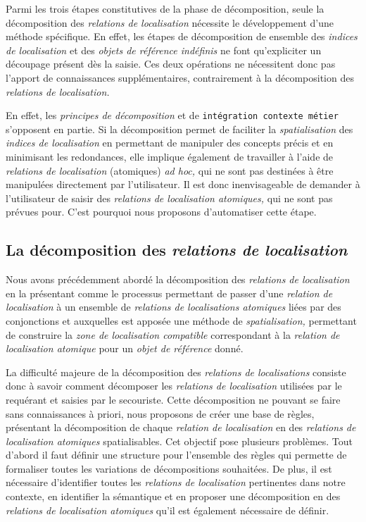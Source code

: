Parmi les trois étapes constitutives de la phase de décomposition,
seule la décomposition des \emph{relations de localisation} nécessite
le développement d'une méthode spécifique. En effet, les étapes de
décomposition de ensemble des \emph{indices de localisation} et des
\emph{objets de référence indéfinis} ne font qu'expliciter un
découpage présent dès la saisie. Ces deux opérations ne nécessitent
donc pas l'apport de connaissances supplémentaires, contrairement à la
décomposition des \emph{relations de localisation.}

En effet, les \emph{principes de décomposition} et de
\texttt{intégration contexte métier} s'opposent en partie. Si la
décomposition permet de faciliter la \emph{spatialisation} des
\emph{indices de localisation} en permettant de manipuler des concepts
précis et en minimisant les redondances, elle implique également de
travailler à l'aide de \emph{relations de localisation} (atomiques)
\emph{ad hoc,} qui ne sont pas destinées à être manipulées directement
par l'utilisateur. Il est donc inenvisageable de demander à
l'utilisateur de saisir des \emph{relations de localisation
  atomiques,} qui ne sont pas prévues pour. C'est pourquoi nous
proposons d'automatiser cette étape.

\subsection{La décomposition des \emph{relations de localisation}}

Nous avons précédemment abordé la décomposition des \emph{relations de
  localisation} en la présentant comme le processus permettant de
passer d'une \emph{relation de localisation} à un ensemble de
\emph{relations de localisations atomiques} liées par des conjonctions
et auxquelles est apposée une méthode de \emph{spatialisation,}
permettant de construire la \emph{zone de localisation compatible}
correspondant à la \emph{relation de localisation atomique} pour un
\emph{objet de référence} donné.

La difficulté majeure de la décomposition des \emph{relations de
  localisations} consiste donc à savoir comment décomposer les
\emph{relations de localisation} utilisées par le requérant et saisies
par le secouriste. Cette décomposition ne pouvant se faire sans
connaissances à priori, nous proposons de créer une base de règles,
présentant la décomposition de chaque \emph{relation de localisation}
en des \emph{relations de localisation atomiques} spatialisables. Cet
objectif pose plusieurs problèmes. Tout d'abord il faut définir une
structure pour l'ensemble des règles qui permette de formaliser toutes
les variations de décompositions souhaitées. De plus, il est
nécessaire d'identifier toutes les \emph{relations de localisation}
pertinentes dans notre contexte, en identifier la sémantique et en
proposer une décomposition en des \emph{relations de localisation
  atomiques} qu'il est également nécessaire de définir.

